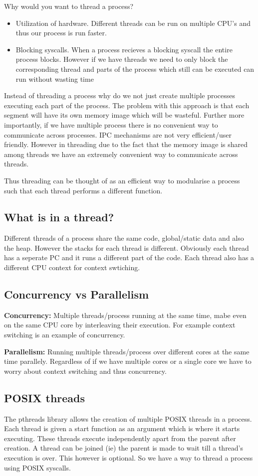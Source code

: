 \documentclass[12pt]{article}
\begin{document}
Why would you want to thread a process?
\begin{itemize}[topsep=0pt, partopsep=0pt, itemsep=0pt, parsep=0pt]
    \item Utilization of hardware. Different threads can be run on multiple CPU's and thus our process is run faster.
    \item Blocking syscalls. When a process recieves a blocking syscall the entire process blocks. However if we have threads we need to only block the corresponding thread and parts of the process which still can be executed can run without wasting time
\end{itemize}
Instead of threading a process why do we not just create multiple processes executing each part of the process. The problem with this approach is that each segment will have its own memory image which will
be wasteful. Further more importantly, if we have multiple process there is no convenient way to communicate across processes. IPC mechanisms are not very efficient/user friendly. However in threading due to the fact
that the memory image is shared among threads we have an extremely convenient way to communicate across threads. 

Thus threading can be thought of as an efficient way to modularise a process such that each thread performs a different function.

\subsection{What is in a thread?}
Different threads of a process share the same code, global/static data and also the heap. However the stacks for each thread is different. 
Obviously each thread has a seperate PC and it runs a different part of the code. Each thread also has a different CPU context for context swtiching.
\subsection{Concurrency vs Parallelism}
\textbf{Concurrency:} Multiple threads/process running at the same time, mabe even on the same CPU core by interleaving
their execution. For example context switching is an example of concurrency.

\textbf{Parallelism:} Running multiple threads/process over different cores at the same time parallely.
Regardless of if we have multiple cores or a single core we have to worry about context switching and thus concurrency.

\subsection{POSIX threads}
The pthreads library allows the creation of multiple POSIX threads in a process. Each thread is given a start
function as an argument which is where it starts executing. These threads execute independently apart from the parent after creation. A thread can be joined (ie) the 
parent is made to wait till a thread's execution is over. This however is optional. So we have a way to thread a process using POSIX syscalls.
\end{document}
